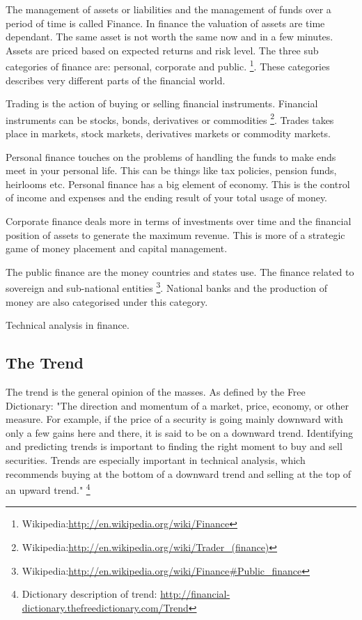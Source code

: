 
The management of assets or liabilities and the management of funds over a
period of time is called Finance. In finance the valuation of assets are time
dependant. The same asset is not worth the same now and in a few minutes. Assets are
priced based on expected returns and risk level. The three sub categories of
finance are: personal, corporate and public. 
\footnote{Wikipedia:\url{http://en.wikipedia.org/wiki/Finance}}.
These categories describes very different parts of the financial world. 

Trading is the action of buying or selling financial instruments.
Financial instruments can be stocks, bonds, derivatives or commodities 
\footnote{Wikipedia:\url{http://en.wikipedia.org/wiki/Trader_(finance)}}.
Trades takes place in markets,  stock markets, derivatives markets or commodity
markets.

Personal finance touches on the problems of handling the funds to make ends
meet in your personal life. This can be things like tax policies, pension
funds, heirlooms etc. Personal finance has a big element of economy. This is
the control of income and expenses and the ending result of your total usage of
money.  

Corporate finance deals more in terms of investments over time and the
financial position of assets to generate the maximum revenue. This is more of a
strategic game of money placement and capital management. 

The public finance are the money countries and states use. The finance related
to sovereign and sub-national entities
\footnote{Wikipedia:\url{http://en.wikipedia.org/wiki/Finance#Public_finance}}.
National banks and the production of money are also categorised under this
category.

Technical analysis in finance. 


\subsection{The Trend}
The trend is the general opinion of the masses. As defined by the Free
Dictionary:  
"The direction and momentum of a market, price, economy, or other measure. For
example, if the price of a security is going mainly downward with only a few
gains here and there, it is said to be on a downward trend. Identifying and
predicting trends is important to finding the right moment to buy and sell
securities. Trends are especially important in technical analysis, which
recommends buying at the bottom of a downward trend and selling at the top of an
upward trend."
\footnote{Dictionary description of trend: \url{http://financial-dictionary.thefreedictionary.com/Trend}}


